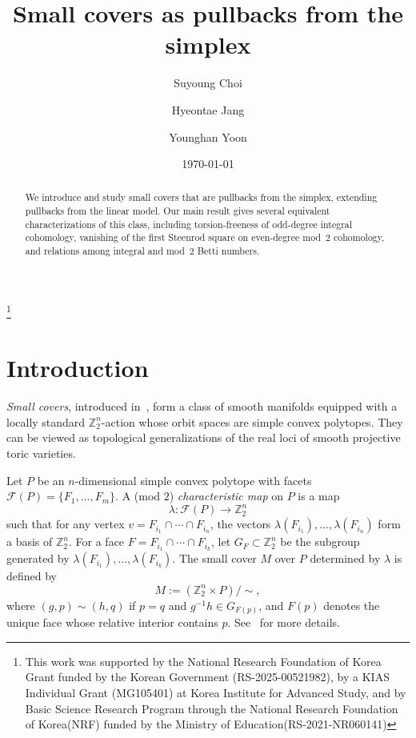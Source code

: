 \documentclass{amsart}
\newcommand{\cF}{\mathcal{F}}
\newcommand{\Z}{\mathbb{Z}}
\theoremstyle{plain}
\numberwithin{equation}{section}
\theoremstyle{definition}
\theoremstyle{remark}
\begin{document}
\title{Small covers as pullbacks from the simplex}

\author[S. Choi]{Suyoung Choi}
\address{Department of mathematics, Ajou University, 206, World cup-ro, Yeongtong-gu, Suwon 16499, Republic of Korea}

\author[H. Jang]{Hyeontae Jang}
\address{School of Mathematics, Korea Institute for Advanced Study, Seoul, South Korea}

\author[Y. Yoon]{Younghan Yoon}
\address{Research Institute of Basic Sciences, Ajou University, 206, World cup-ro, Yeongtong-gu, Suwon 16499, Republic of Korea}


\date{\today}
\thanks{This work was supported by the National Research Foundation of Korea Grant funded by
the Korean Government (RS-2025-00521982), by a KIAS Individual Grant (MG105401) at Korea Institute for Advanced Study, and by Basic Science Research Program through the  National Research Foundation of Korea(NRF) funded by the Ministry of Education(RS-2021-NR060141)}

\begin{abstract}
We introduce and study small covers that are pullbacks from the simplex, extending pullbacks from the linear model.
Our main result gives several equivalent characterizations of this class, including torsion-freeness of odd-degree integral cohomology, vanishing of the first Steenrod square on even-degree mod~$2$ cohomology, and relations among integral and mod~$2$ Betti numbers.
\end{abstract}

\maketitle

\section{Introduction}

\emph{Small covers}, introduced in~\cite{Davis-Januszkiewicz1991}, form a class of smooth manifolds equipped with a locally standard $\Z_2^n$-action whose orbit spaces are simple convex polytopes.
They can be viewed as topological generalizations of the real loci of smooth projective toric varieties.

Let $P$ be an $n$-dimensional simple convex polytope with facets $\cF(P)=\{F_1,\dots,F_m\}$.
A (mod $2$) \emph{characteristic map} on $P$ is a map
$$
    \lambda \colon \cF(P)\to \Z_2^n
$$
such that for any vertex $v=F_{i_1}\cap \cdots \cap F_{i_n}$, the vectors $\lambda(F_{i_1}),\dots,\lambda(F_{i_n})$ form a basis of $\Z_2^n$.
For a face $F=F_{i_1}\cap \cdots \cap F_{i_k}$, let $G_F\subset \Z_2^n$ be the subgroup generated by $\lambda(F_{i_1}),\dots,\lambda(F_{i_k})$.
The small cover $M$ over $P$ determined by $\lambda$ is defined by
$$
    M:= (\Z_2^n\times P)/\sim,
$$
where $(g,p)\sim (h,q)$ if $p=q$ and $g^{-1}h\in G_{F(p)}$, and $F(p)$ denotes the unique face whose relative interior contains $p$.
See~\cite{Davis-Januszkiewicz1991,Buchstaber-Panov2015book} for more details.
\end{document}
